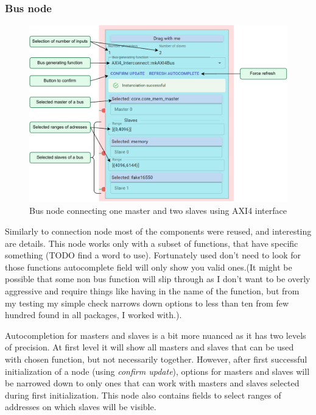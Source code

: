 \documentclass[12pt]{report}
\begin{document}
\subsubsection{Bus node}
\begin{figure}[!h]
    \centering
    
    \includegraphics[width=1\columnwidth]{pdfExports/LargeMap-BusNode.drawio.pdf}
    \caption{Bus node connecting one master and two slaves using AXI4 interface}
\end{figure}
Similarly to connection node most of the components were reused, and interesting are details. This node works only with a subset of functions, that have specific something (TODO find a word to use). Fortunately used don't need to look for those functions autocomplete field will only show you valid ones.(It might be possible that some non bus function will slip through as I don't want to be overly aggressive and require things like having  in the name of the function, but from my testing my simple check narrows down options to less than ten from few hundred found in all packages, I worked with.).  

Autocompletion for masters and slaves is a bit more nuanced as it has two levels of precision. At first level it will show all masters and slaves that can be used with chosen function, but not necessarily together. However, after first successful initialization of a node (using \emph{confirm update}), options for masters and slaves will be narrowed down to only ones that can work with masters and slaves selected during first initialization.
This node also contains fields to select ranges of addresses on which slaves will be visible. 
\end{document}
